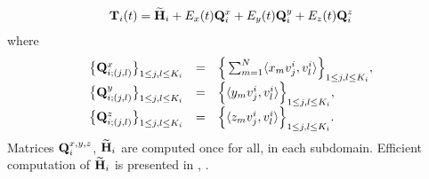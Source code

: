 \begin{eqnarray*}
{\bf T}_i(t) = \widetilde{{\bf H}}_{i} + E_x(t){\bf Q}^{x}_i + E_y(t){\bf Q}^{y}_i + E_z(t){\bf Q}^{z}_i
\end{eqnarray*}
where 
\begin{eqnarray}\label{Q}
\left.
\begin{array}{lcl}
\big\{{\bf Q}^{x}_{i;(j,l)}\big\}_{1\leq j,l\leq K_i} & = & \Big\{\sum_{m=1}^N\langle x_m v_j^{i}, v_l^i\rangle\Big\}_{1\leq j,l\leq K_i}, \\
 \big\{{\bf Q}^{y}_{i;(j,l)}\big\}_{1\leq j,l\leq K_i} & = & \Big\{\langle y_mv_j^{i}, v_l^i\rangle\Big\}_{1\leq j,l\leq K_i}, \\ 
\big\{{\bf Q}^{z}_{i;(j,l)}\big\}_{1\leq j,l\leq K_i} & = & \Big\{\langle z_mv^i_{j}, v^i_l\rangle \Big\}_{1\leq j,l\leq K_i}.
\end{array}
\right.
\end{eqnarray}
Matrices ${\bf Q}_i^{x,y,z}$, $\widetilde{{\bf H}}_{i}$ are computed once for all, in each subdomain. Efficient computation of $\widetilde{{\bf H}}_{i}$ is presented in \cite{CAM15-09}, \cite{CAM15-10}.%
